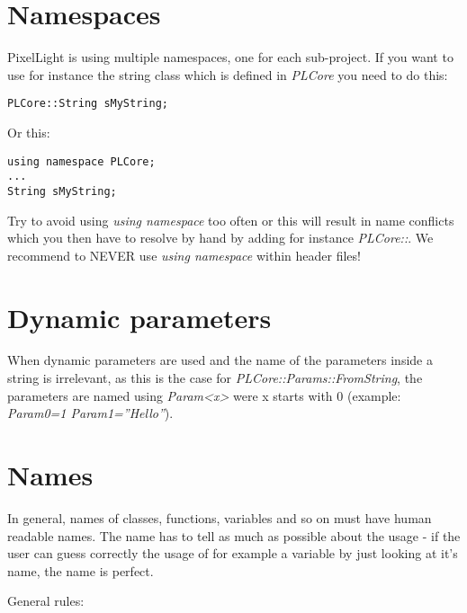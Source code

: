 \section{Namespaces}
PixelLight is using multiple namespaces, one for each sub-project. If you want to use for instance the string class which is defined in \emph{PLCore} you need to do this:

\begin{lstlisting}[caption=Explicit namespace]
PLCore::String sMyString;
\end{lstlisting}

Or this:

\begin{lstlisting}[caption=Using namespace]
using namespace PLCore;
...
String sMyString;
\end{lstlisting}

Try to avoid using \emph{using namespace} too often or this will result in name conflicts which you then have to resolve by hand by adding for instance \emph{PLCore::}. We recommend to NEVER use \emph{using namespace} within header files!




\section{Dynamic parameters}
When dynamic parameters are used and the name of the parameters inside a string is irrelevant, as this is the case for \emph{PLCore::Params::FromString}, the parameters are named using \emph{Param<x>} were x starts with $0$ (example: \emph{Param0=1 Param1=''Hello''}).  




\section{Names}
In general, names of classes, functions, variables and so on must have human readable names. The name has to tell as much as possible about the usage - if the user can guess correctly the usage of for example a variable by just looking at it's name, the name is perfect.

General rules:

